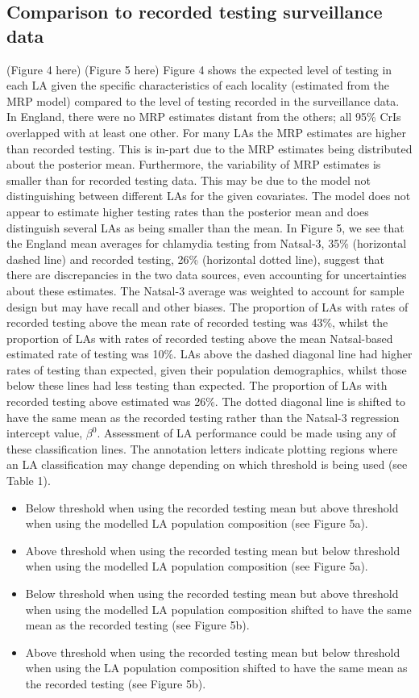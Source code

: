 \documentclass[fleqn,10pt]{wlscirep}
\begin{document}
\subsection*{Comparison to recorded testing surveillance data}
 (Figure 4 here)
(Figure 5 here)
Figure 4 shows the expected level of testing in each LA given the specific characteristics of each locality (estimated from the MRP model) compared to the level of testing recorded in the surveillance data. In England, there were no MRP estimates distant from the others; all 95\% CrIs overlapped with at least one other. For many LAs the MRP estimates are higher than recorded testing. This is in-part due to the MRP estimates being distributed about the posterior mean. Furthermore, the variability of MRP estimates is smaller than for recorded testing data. This may be due to the model not distinguishing between different LAs for the given covariates. The model does not appear to estimate higher testing rates than the posterior mean and does distinguish several LAs as being smaller than the mean. In Figure 5, we see that the England mean averages for chlamydia testing from Natsal-3, 35\% (horizontal dashed line) and recorded testing, 26\% (horizontal dotted line), suggest that there are discrepancies in the two data sources, even accounting for uncertainties about these estimates. The Natsal-3 average was weighted to account for sample design but may have recall and other biases. The proportion of LAs with rates of recorded testing above the mean rate of recorded testing was 43\%, whilst the proportion of LAs with rates of recorded testing above the mean Natsal-based estimated rate of testing was 10\%. LAs above the dashed diagonal line had higher rates of testing than expected, given their population demographics, whilst those below these lines had less testing than expected. The proportion of LAs with recorded testing above estimated was 26\%. 
The dotted diagonal line is shifted to have the same mean as the recorded testing rather than the Natsal-3 regression intercept value, $\beta^0$. Assessment of LA performance could be made using any of these classification lines. 
The annotation letters indicate plotting regions where an LA classification may change depending on which threshold is being used (see Table 1).
\begin{itemize}
\item	Below threshold when using the recorded testing mean but above threshold when using the modelled LA population composition (see Figure 5a).
\item	Above threshold when using the recorded testing mean but below threshold when using the modelled LA population composition (see Figure 5a).
\item	Below threshold when using the recorded testing mean but above threshold when using the modelled LA population composition shifted to have the same mean as the recorded testing (see Figure 5b).
\item	Above threshold when using the recorded testing mean but below threshold when using the LA population composition shifted to have the same mean as the recorded testing (see Figure 5b).
\end{itemize}
\end{document}
